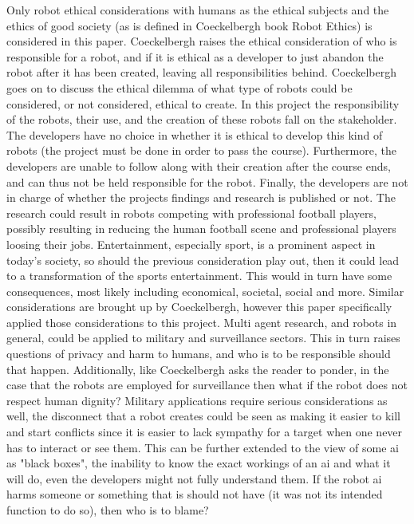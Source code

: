 Only robot ethical considerations with humans as the ethical subjects and the ethics of good society (as is defined in Coeckelbergh book Robot Ethics\:\cite{coeckelbergh_robot_2022}) is considered in this paper.
Coeckelbergh\:\cite{coeckelbergh_robot_2022} raises the ethical consideration of who is responsible for a robot, and if it is ethical as a developer to just abandon the robot after it has been created, leaving all responsibilities behind. Coeckelbergh\:\cite{coeckelbergh_robot_2022} goes on to discuss the ethical dilemma of what type of robots could be considered, or not considered, ethical to create.
In this project the responsibility of the robots, their use, and the creation of these robots fall on the stakeholder. The developers have no choice in whether it is ethical to develop this kind of robots (the project must be done in order to pass the course). Furthermore, the developers are unable to follow along with their creation after the course ends, and can thus not be held responsible for the robot. Finally, the developers are not in charge of whether the projects findings and research is published or not.
The research could result in robots competing with professional football players, possibly resulting in reducing the human football scene and professional players loosing their jobs. Entertainment, especially sport, is a prominent aspect in today's society, so should the previous consideration play out, then it could lead to a transformation of the sports entertainment. This would in turn have some consequences, most likely including economical, societal, social and more. Similar considerations are brought up by Coeckelbergh\:\cite{coeckelbergh_robot_2022}, however this paper specifically applied those considerations to this project.
Multi agent research, and robots in general, could be applied to military and surveillance sectors. This in turn raises questions of privacy and harm to humans, and who is to be responsible should that happen. Additionally, like Coeckelbergh\:\cite{coeckelbergh_robot_2022} asks the reader to ponder, in the case that the robots are employed for surveillance then what if the robot does not respect human dignity? Military applications require serious considerations as well, the disconnect that a robot creates could be seen as making it easier to kill and start conflicts since it is easier to lack sympathy for a target when one never has to interact or see them. This can be further extended to the view of some \ac{ai} as "black boxes", the inability to know the exact workings of an \ac{ai} and what it will do, even the developers might not fully understand them. If the robot \ac{ai} harms someone or something that is should not have (it was not its intended function to do so), then who is to blame?

